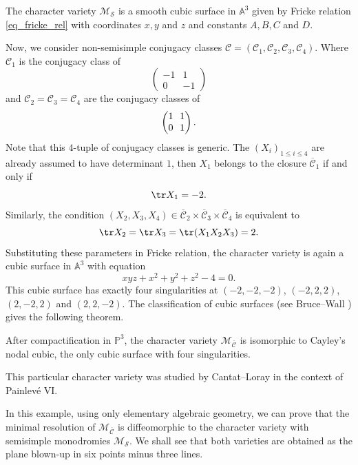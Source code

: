 \begin{proposition}
The character variety $\mathcal{M}_{\boldsymbol{\mathcal{S}}}$ is a smooth cubic surface in $\mathbb{A}^3$ given by Fricke relation \eqref{eq_fricke_rel} with coordinates $x,y$ and $z$ and constants $A, B, C$ and $D$.
\end{proposition}

Now, we consider non-semisimple conjugacy classes $\boldsymbol{\mathcal{C}}=\left(\mathcal{C}_1,\mathcal{C}_2,\mathcal{C}_3,\mathcal{C}_4\right)$. Where $\mathcal{C}_1$ is the conjugacy class of
\[
\begin{pmatrix}
-1 & 1 \\
0 & -1
\end{pmatrix}
\]
and $\mathcal{C}_2=\mathcal{C}_3 = \mathcal{C}_4$ are the conjugacy classes of
\[\arraycolsep3.5pt
\begin{pmatrix}
1 & 1 \\
0 & 1
\end{pmatrix}.
\]
Note that this $4$-tuple of conjugacy classes is generic. The $(X_i)_{1\le i \le 4}$ are already assumed to have determinant $1$, then $X_1$ belongs to the closure $\overline{\mathcal{C}}_1$ if and only if
\[
\tr X_1 = -2.
\]
Similarly, the condition $(X_2, X_3, X_4)\in \overline{\mathcal{C}}_2\times \overline{\mathcal{C}}_3 \times
\overline{\mathcal{C}}_4$ is equivalent to
\[
\tr X_2 = \tr X_3 = \tr (X_1 X_2 X_3)= 2.
\]
Substituting these parameters in Fricke relation, the character variety is again a cubic surface in $\mathbb{A}^3$ with equation
\begin{equation}\label{eq_cayley_char}
x y z + x^2 +y^2 +z^2 - 4 =0.
\end{equation}
This cubic surface has exactly four singularities at $(-2,-2,-2)$, $(-2,2,2)$, $(2,-2,2)$ and $(2,2,-2)$.
The classification of cubic surfaces (see Bruce--Wall \cite{Bruce_cubic}) gives the following theorem.
\begin{theorem}\label{th_compactification_cayley}
After compactification in $\mathbb{P}^3$, the character variety $\mathcal{M}_{\overline{\boldsymbol{\mathcal{C}}}}$ is isomorphic to Cayley's nodal cubic, the only cubic surface with four singularities.
\end{theorem}
This particular character variety was studied by Cantat--Loray \cite{Cantat_Loray} in the context of Painlevé VI.

In this example, using only elementary algebraic geometry, we can prove that the minimal resolution of $\mathcal{M}_{\overline{\boldsymbol{\mathcal{C}}}}$ is diffeomorphic to the character variety with semisimple monodromies $\mathcal{M}_{\boldsymbol{\mathcal{S}}}$. We shall see that both varieties are obtained as the plane blown-up in six points minus three lines.

